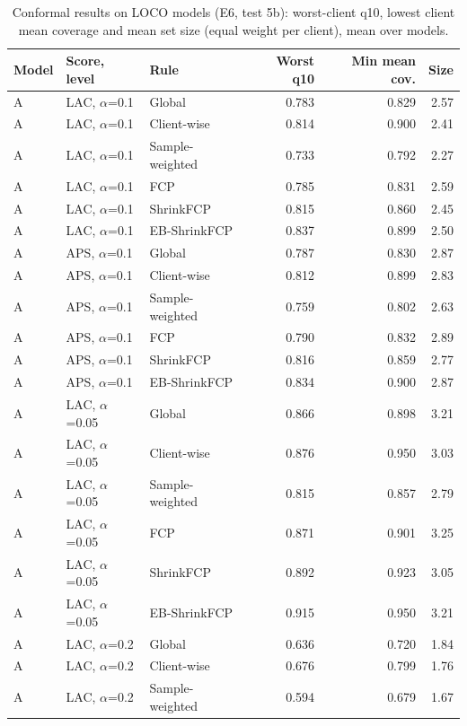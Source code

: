 \documentclass[10pt]{article}
\begin{document}
\begin{table}[!htbp]
\centering
\scriptsize
\caption{Conformal results on LOCO models (E6, test 5b): worst-client q10, lowest client mean coverage and mean set size (equal weight per client), mean over models.}
\label{tab:s5E6}
\begin{tabular}{@{}lllrrr@{}}
\toprule
Model & Score, level & Rule & Worst q10 & Min mean cov. & Size \\
\midrule
A & LAC, $\alpha$=0.1 & Global & 0.783 & 0.829 & 2.57 \\
A & LAC, $\alpha$=0.1 & Client-wise & 0.814 & 0.900 & 2.41 \\
A & LAC, $\alpha$=0.1 & Sample-weighted & 0.733 & 0.792 & 2.27 \\
A & LAC, $\alpha$=0.1 & FCP & 0.785 & 0.831 & 2.59 \\
A & LAC, $\alpha$=0.1 & ShrinkFCP & 0.815 & 0.860 & 2.45 \\
A & LAC, $\alpha$=0.1 & EB-ShrinkFCP & 0.837 & 0.899 & 2.50 \\
\midrule
A & APS, $\alpha$=0.1 & Global & 0.787 & 0.830 & 2.87 \\
A & APS, $\alpha$=0.1 & Client-wise & 0.812 & 0.899 & 2.83 \\
A & APS, $\alpha$=0.1 & Sample-weighted & 0.759 & 0.802 & 2.63 \\
A & APS, $\alpha$=0.1 & FCP & 0.790 & 0.832 & 2.89 \\
A & APS, $\alpha$=0.1 & ShrinkFCP & 0.816 & 0.859 & 2.77 \\
A & APS, $\alpha$=0.1 & EB-ShrinkFCP & 0.834 & 0.900 & 2.87 \\
\midrule
A & LAC, $\alpha$=0.05 & Global & 0.866 & 0.898 & 3.21 \\
A & LAC, $\alpha$=0.05 & Client-wise & 0.876 & 0.950 & 3.03 \\
A & LAC, $\alpha$=0.05 & Sample-weighted & 0.815 & 0.857 & 2.79 \\
A & LAC, $\alpha$=0.05 & FCP & 0.871 & 0.901 & 3.25 \\
A & LAC, $\alpha$=0.05 & ShrinkFCP & 0.892 & 0.923 & 3.05 \\
A & LAC, $\alpha$=0.05 & EB-ShrinkFCP & 0.915 & 0.950 & 3.21 \\
\midrule
A & LAC, $\alpha$=0.2 & Global & 0.636 & 0.720 & 1.84 \\
A & LAC, $\alpha$=0.2 & Client-wise & 0.676 & 0.799 & 1.76 \\
A & LAC, $\alpha$=0.2 & Sample-weighted & 0.594 & 0.679 & 1.67 \\

\end{tabular}
\end{table}
\end{document}
